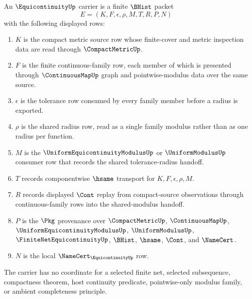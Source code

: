 \begin{definition}
\label{def:equicontinuity-carrier}
An $\EquicontinuityUp$ carrier is a finite $\BHist$ packet
$$
E=(K,F,\epsilon,\rho,M,T,R,P,N)
$$
with the following displayed rows:
\begin{enumerate}
\item $K$ is the compact metric source row whose finite-cover and metric inspection data are read through $\CompactMetricUp$.
\item $F$ is the finite continuous-family row, each member of which is presented through $\ContinuousMapUp$ graph and pointwise-modulus data over the same source.
\item $\epsilon$ is the tolerance row consumed by every family member before a radius is exported.
\item $\rho$ is the shared radius row, read as a single family modulus rather than as one radius per function.
\item $M$ is the $\UniformEquicontinuityModulusUp$ or $\UniformModulusUp$ consumer row that records the shared tolerance-radius handoff.
\item $T$ records componentwise $\hsame$ transport for $K,F,\epsilon,\rho,M$.
\item $R$ records displayed $\Cont$ replay from compact-source observations through continuous-family rows into the shared-modulus handoff.
\item $P$ is the $\Pkg$ provenance over $\CompactMetricUp$, $\ContinuousMapUp$, $\UniformEquicontinuityModulusUp$, $\UniformModulusUp$, $\FiniteNetEquicontinuityUp$, $\BHist$, $\hsame$, $\Cont$, and $\NameCert$.
\item $N$ is the local $\NameCert_{\EquicontinuityUp}$ row.
\end{enumerate}
The carrier has no coordinate for a selected finite net, selected subsequence, compactness theorem, host continuity predicate, pointwise-only modulus family, or ambient completeness principle.
\end{definition}

